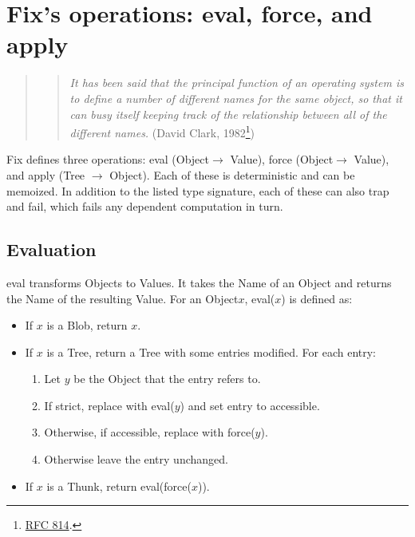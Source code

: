 \documentclass{article}
\newcommand{\blob}{\textrm{Blob}\xspace}
\newcommand{\valuex}{\textrm{Value}\xspace}
\newcommand{\valuexs}{\textrm{Value}s\xspace}
\newcommand{\object}{\textrm{Object}\xspace}
\newcommand{\objects}{\textrm{Object}s\xspace}
\newcommand{\thunk}{\textrm{Thunk}\xspace}
\newcommand{\name}{\textrm{Name}\xspace}
\newcommand{\tree}{\textrm{Tree}\xspace}
\newcommand{\eval}{\textsf{eval}}
\newcommand{\apply}{\textsf{apply}}
\newcommand{\force}{\textsf{force}}
\begin{document}
\section{Fix's operations: \eval{}, \force{}, and \apply{}}

\begin{quote}
\begin{quote}
\textit{It has been said that the principal function of an operating system
is to define a number of different names for the same object, so that it
can  busy  itself  keeping  track of the relationship between all of the
different names.} (David Clark, 1982\footnote{\href{https://www.rfc-editor.org/rfc/rfc814.html}{RFC 814}.})
\end{quote}
\end{quote}

Fix defines three operations: \eval{} (\object $\rightarrow$ \valuex),
\force{} (\object $\rightarrow$ \valuex), and \apply{} (\tree
$\rightarrow$ \object). Each of these is deterministic and can be
memoized. In addition to the listed type signature, each of these can
also trap and fail, which fails any dependent computation in turn.

\subsection{Evaluation}

\eval\xspace transforms \objects to \valuexs. It takes the \name of
an \object and returns the \name of the resulting \valuex. For an
\object $x$, \eval($x$) is defined as:
\begin{itemize}[itemsep=0pt]
\item If $x$ is a \blob, return $x$.

\item If $x$ is a \tree, return a \tree with some entries modified. For each entry:
  \begin{enumerate}[topsep=0pt, itemsep=0pt]
    \item Let $y$ be the \object that the entry refers to.
    \item If strict, replace with \eval($y$) and set entry to accessible.
    \item Otherwise, if accessible, replace with \force($y$).
    \item Otherwise leave the entry unchanged.
  \end{enumerate}

\item If $x$ is a \thunk, return \eval(\force($x$)).
\end{itemize}
\end{document}
